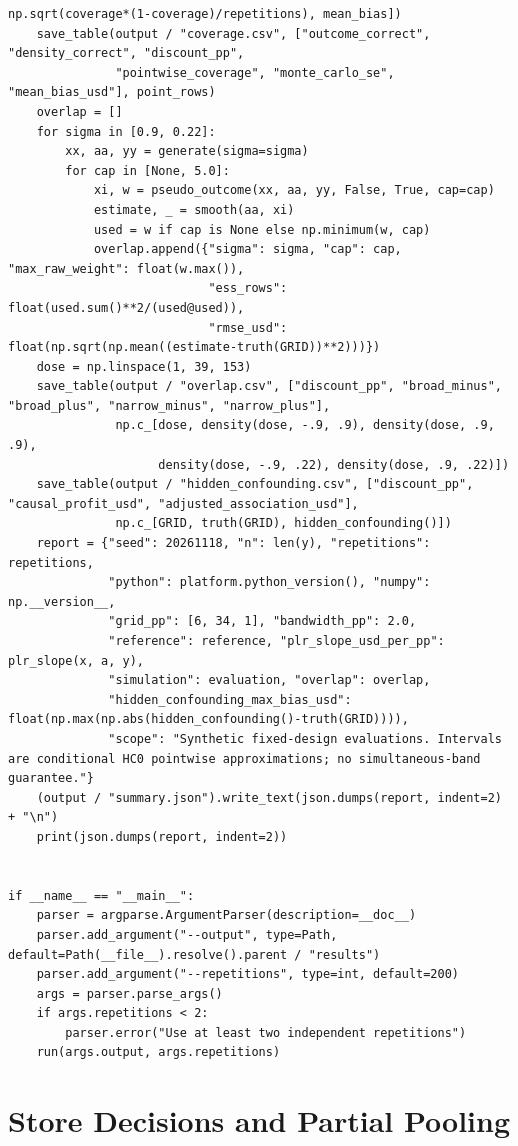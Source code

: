 \begin{Verbatim}[breaklines,breakanywhere,fontsize=\small]
                               np.sqrt(coverage*(1-coverage)/repetitions), mean_bias])
    save_table(output / "coverage.csv", ["outcome_correct", "density_correct", "discount_pp",
               "pointwise_coverage", "monte_carlo_se", "mean_bias_usd"], point_rows)
    overlap = []
    for sigma in [0.9, 0.22]:
        xx, aa, yy = generate(sigma=sigma)
        for cap in [None, 5.0]:
            xi, w = pseudo_outcome(xx, aa, yy, False, True, cap=cap)
            estimate, _ = smooth(aa, xi)
            used = w if cap is None else np.minimum(w, cap)
            overlap.append({"sigma": sigma, "cap": cap, "max_raw_weight": float(w.max()),
                            "ess_rows": float(used.sum()**2/(used@used)),
                            "rmse_usd": float(np.sqrt(np.mean((estimate-truth(GRID))**2)))})
    dose = np.linspace(1, 39, 153)
    save_table(output / "overlap.csv", ["discount_pp", "broad_minus", "broad_plus", "narrow_minus", "narrow_plus"],
               np.c_[dose, density(dose, -.9, .9), density(dose, .9, .9),
                     density(dose, -.9, .22), density(dose, .9, .22)])
    save_table(output / "hidden_confounding.csv", ["discount_pp", "causal_profit_usd", "adjusted_association_usd"],
               np.c_[GRID, truth(GRID), hidden_confounding()])
    report = {"seed": 20261118, "n": len(y), "repetitions": repetitions,
              "python": platform.python_version(), "numpy": np.__version__,
              "grid_pp": [6, 34, 1], "bandwidth_pp": 2.0,
              "reference": reference, "plr_slope_usd_per_pp": plr_slope(x, a, y),
              "simulation": evaluation, "overlap": overlap,
              "hidden_confounding_max_bias_usd": float(np.max(np.abs(hidden_confounding()-truth(GRID)))),
              "scope": "Synthetic fixed-design evaluations. Intervals are conditional HC0 pointwise approximations; no simultaneous-band guarantee."}
    (output / "summary.json").write_text(json.dumps(report, indent=2) + "\n")
    print(json.dumps(report, indent=2))


if __name__ == "__main__":
    parser = argparse.ArgumentParser(description=__doc__)
    parser.add_argument("--output", type=Path, default=Path(__file__).resolve().parent / "results")
    parser.add_argument("--repetitions", type=int, default=200)
    args = parser.parse_args()
    if args.repetitions < 2:
        parser.error("Use at least two independent repetitions")
    run(args.output, args.repetitions)
\end{Verbatim}

\hypertarget{M06-store-decisions-and-partial-pooling}{%
\section{Store Decisions and Partial
Pooling}\label{M06-store-decisions-and-partial-pooling}}

